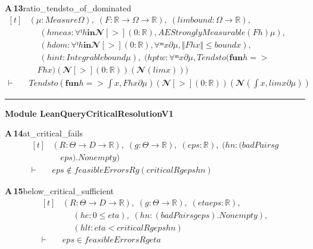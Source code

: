 \documentclass[conference]{IEEEtran}
\theoremstyle{definition}
\newcommand{\lean}[1]{\textsf{\footnotesize #1}}
\begin{document}
\noindent\textbf{A\,13}\quad\lean{ratio\_tendsto\_of\_dominated}
{\footnotesize\[ \begin{aligned}[t]
&(\mu : \mathit{Measure} \Omega ),\; (\mathit{F} : \mathbb{R} \to \Omega \to \mathbb{R} ),\; (\mathit{lim} \mathit{bound} : \Omega \to \mathbb{R} ),\\
&\quad \; (\mathit{hmeas} : \forall  ᶠ \mathit{h} \mathbf{in} 𝓝[>] (0:\mathbb{R} ), \mathit{AEStronglyMeasurable} (\mathit{F} \mathit{h}) \mu ),\\
&\quad \; (\mathit{hdom} : \forall  ᶠ \mathit{h} \mathbf{in} 𝓝[>] (0:\mathbb{R} ), \forall  ᵐ \mathit{x} ∂\mu , \Vert \mathit{F} \mathit{h} \mathit{x}\Vert \leq \mathit{bound} \mathit{x}),\\
&\quad \; (\mathit{hint} : \mathit{Integrable} \mathit{bound} \mu ),\; (\mathit{hptw} : \forall  ᵐ \mathit{x} ∂\mu , \mathit{Tendsto} (\mathbf{fun} \mathit{h} =>\\
&\quad \mathit{F} \mathit{h} \mathit{x}) (𝓝[>] (0:\mathbb{R} )) (𝓝 (\mathit{lim} \mathit{x})))\\
\vdash\;&\mathit{Tendsto} (\mathbf{fun} \mathit{h} => \int \mathit{x}, \mathit{F} \mathit{h} \mathit{x} ∂\mu ) (𝓝[>] (0:\mathbb{R} )) (𝓝 (\int \mathit{x}, \mathit{lim} \mathit{x} ∂\mu ))
\end{aligned} \]}

\vspace{4pt}\noindent\rule{\columnwidth}{0.4pt}\par\vspace{2pt}
\noindent\textbf{Module \lean{LeanQueryCriticalResolutionV1}}\par\vspace{3pt}

\noindent\textbf{A\,14}\quad\lean{at\_critical\_fails}
{\footnotesize\[ \begin{aligned}[t]
&(\mathit{R} : \Theta \to \mathit{D} \to \mathbb{R} ),\; (\mathit{g} : \Theta \to \mathbb{R} ),\; (\mathit{eps} : \mathbb{R} ),\; (\mathit{hn} : (\mathit{badPairs} \mathit{g}\\
&\quad \mathit{eps}).\mathit{Nonempty})\\
\vdash\;&\mathit{eps} \notin \mathit{feasibleErrors} \mathit{R} \mathit{g} (\mathit{critical} \mathit{R} \mathit{g} \mathit{eps} \mathit{hn})
\end{aligned} \]}

\noindent\textbf{A\,15}\quad\lean{below\_critical\_sufficient}
{\footnotesize\[ \begin{aligned}[t]
&(\mathit{R} : \Theta \to \mathit{D} \to \mathbb{R} ),\; (\mathit{g} : \Theta \to \mathbb{R} ),\; (\mathit{eta} \mathit{eps} : \mathbb{R} ),\\
&\quad \; (\mathit{he} : 0 \leq \mathit{eta}),\; (\mathit{hn} : (\mathit{badPairs} \mathit{g} \mathit{eps}).\mathit{Nonempty}),\\
&\quad \; (\mathit{hlt} : \mathit{eta}<\mathit{critical} \mathit{R} \mathit{g} \mathit{eps} \mathit{hn})\\
\vdash\;&\mathit{eps} \in \mathit{feasibleErrors} \mathit{R} \mathit{g} \mathit{eta}
\end{aligned} \]}
\end{document}
